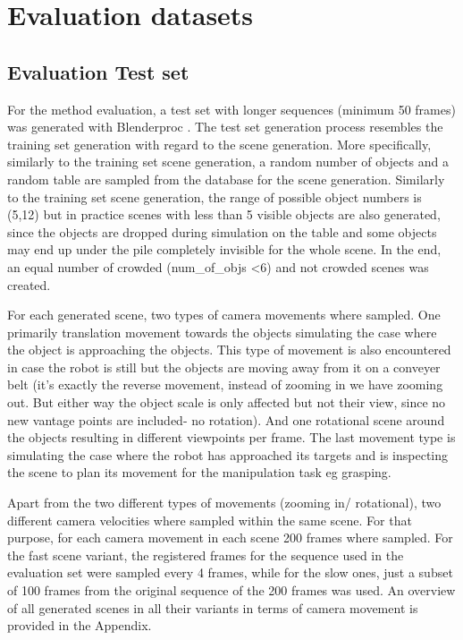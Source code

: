\section{Evaluation datasets}
\subsection{Evaluation Test set}
For the method evaluation, a test set with longer sequences (minimum 50 frames) was generated with Blenderproc \parencite{denninger2019blenderproc}. The test set generation process resembles the training set generation with regard to the scene generation. More specifically, similarly to the training set scene generation, a random number of objects and a random table are sampled from the database for the scene generation. Similarly to the training set scene generation, the range of possible object numbers is (5,12) but in practice scenes with less than 5 visible objects are also generated, since the objects are dropped during simulation on the table and some objects may end up under the pile completely invisible for the whole scene. In the end, an equal number of crowded (num\_of\_objs <6) and not crowded scenes was created. \par
For each generated scene, two types of camera movements where sampled. One primarily translation movement towards the objects simulating the case where the object is approaching the objects. This type of movement is also encountered in case the robot is still but the objects are moving away from it on a conveyer belt (it's exactly the reverse movement, instead of zooming in we have zooming out. But either way the object scale is only affected but not their view, since no new vantage points are included- no rotation). And one rotational scene around the objects resulting in different viewpoints per frame. The last movement type is simulating the case where the robot has approached its targets and is inspecting the scene to plan its movement for the manipulation task eg grasping. \par

Apart from the two different types of movements (zooming in/ rotational), two different camera velocities where sampled within the same scene. For that purpose, for each camera movement in each scene 200 frames where sampled. For the fast scene variant, the registered frames for the sequence used in the evaluation set were sampled every 4 frames, while for the slow ones, just a subset of 100 frames from the original sequence of the 200 frames was used. An overview of all generated scenes in all their variants in terms of camera movement is provided in the Appendix. \par 

